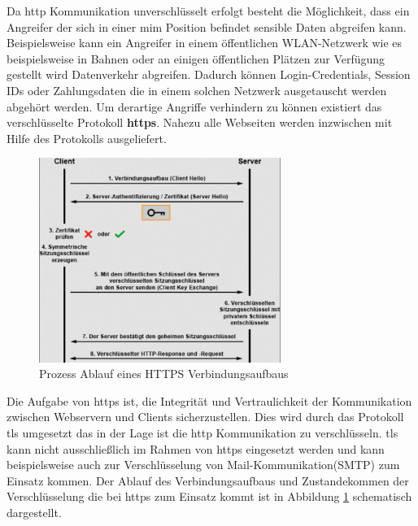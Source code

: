 




Da \ac{http} Kommunikation unverschlüsselt erfolgt besteht die Möglichkeit, dass ein Angreifer der sich in einer \ac{mim} Position befindet sensible Daten abgreifen kann.
Beispielsweise kann ein Angreifer in einem öffentlichen WLAN-Netzwerk wie es beispielsweise in Bahnen oder an einigen öffentlichen Plätzen zur Verfügung gestellt wird Datenverkehr abgreifen.
Dadurch können Login-Credentials, Session IDs oder Zahlungsdaten die in einem solchen Netzwerk ausgetauscht werden abgehört werden.
Um derartige Angriffe verhindern zu können existiert das verschlüsselte Protokoll \textbf{\ac{https}}.
Nahezu alle Webseiten werden inzwischen mit Hilfe des Protokolls ausgeliefert.

\begin{figure}[!hbt]
    \centering
    \includegraphics[width=0.7\textwidth]{./images/HTTPS-Processflow.png}
    \caption{Prozess Ablauf eines HTTPS Verbindungsaufbaus}
    \label{fig:https-porcess-flow}
\end{figure}

Die Aufgabe von \ac{https} ist, die Integrität und Vertraulichkeit der Kommunikation zwischen Webservern und Clients sicherzustellen.
Dies wird durch das Protokoll \ac{tls} umgesetzt das in der Lage ist die \ac{http} Kommunikation zu verschlüsseln.
\ac{tls} kann nicht ausschließlich im Rahmen von \ac{https} eingesetzt werden und kann beispielsweise auch zur Verschlüsselung von Mail-Kommunikation(SMTP) zum Einsatz kommen.
Der Ablauf des Verbindungsaufbaus und Zustandekommen der Verschlüsselung die bei \ac{https} zum Einsatz kommt ist in Abbildung \ref{fig:https-porcess-flow} schematisch dargestellt.

